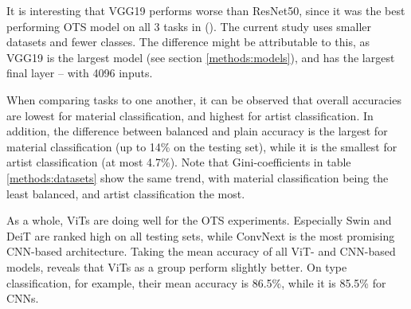 It is interesting that VGG19 performs worse than ResNet50, since it was the best performing OTS model on all 3 tasks in \citeauthor{sabatelli2018deep} (\citeyear{sabatelli2018deep}). The current study uses smaller datasets and fewer classes. The difference might be attributable to this, as VGG19 is the largest model (see section \ref{methods:models}), and has the largest final layer -- with 4096 inputs.

When comparing tasks to one another, it can be observed that overall accuracies are lowest for material classification, and highest for artist classification. In addition, the difference between balanced and plain accuracy is the largest for material classification (up to 14\% on the testing set), while it is the smallest for artist classification (at most 4.7\%). Note that Gini-coefficients in table \ref{methods:datasets} show the same trend, with material classification being the least balanced, and artist classification the most.

As a whole, ViTs are doing well for the OTS experiments. Especially Swin and DeiT are ranked high on all testing sets, while ConvNext is the most promising CNN-based architecture. Taking the mean accuracy of all ViT- and CNN-based models, reveals that ViTs as a group perform slightly better. On type classification, for example, their mean accuracy is 86.5\%, while it is 85.5\% for CNNs.



